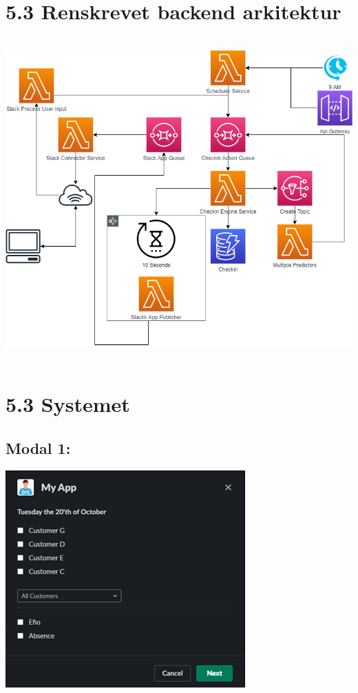 \documentclass[11pt]{report}
\begin{document}
\section*{5.3 Renskrevet backend arkitektur}
\begin{center} 
\includegraphics[height=12.39cm, width=15.92cm]{struktur-renskrevet}
\end{center}

\newpage

\section*{5.3 Systemet}

\subsection*{Modal 1:}

\begin{center} 
\includegraphics[height=8.35cm, width=9.2cm]{modal1}
\end{center}
\end{document}
